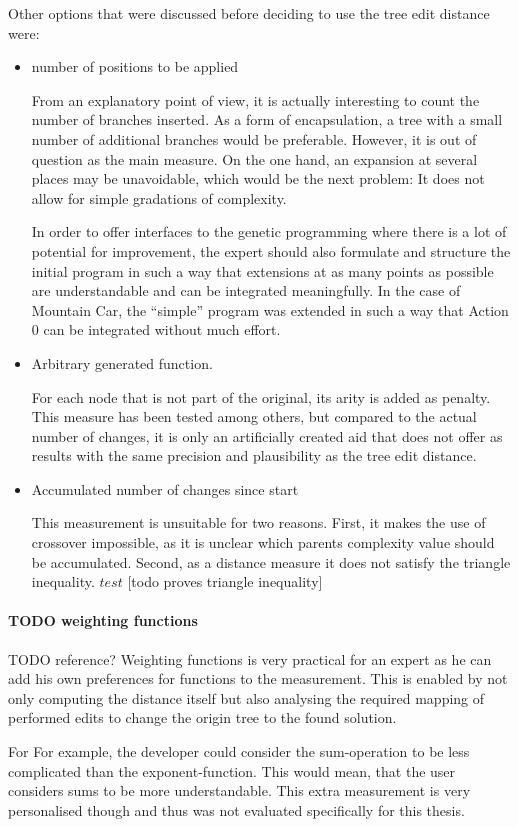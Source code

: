 Other options that were discussed before deciding to use the tree edit distance were:
\begin{itemize}
\item number of positions to be applied

From an explanatory point of view, it is actually interesting to count the number of branches inserted. As a form of encapsulation, a tree with a small number of additional branches would be preferable.
However, it is out of question as the main measure. On the one hand, an expansion at several places may be unavoidable, which would be the next problem: It does not allow for simple gradations of complexity.

In order to offer interfaces to the genetic programming where there is a lot of potential for improvement, the expert should also formulate and structure the initial program in such a way that extensions at as many points as possible are understandable and can be integrated meaningfully. In the case of Mountain Car, the ``simple'' program was extended in such a way that Action 0 can be integrated without much effort.

\item Arbitrary generated function.

For each node that is not part of the original, its arity is added as penalty.
This measure has been tested among others, but compared to the actual number of changes, it is only an artificially created aid that does not offer as results with the same precision and plausibility as the tree edit distance.

\item Accumulated number of changes since start

This measurement is unsuitable for two reasons. First, it makes the use of crossover impossible, as it is unclear which parents complexity value should be accumulated. Second, as a distance measure it does not satisfy the triangle inequality.
$test$ [todo proves triangle inequality]

\end{itemize}

\paragraph{TODO weighting functions}

TODO reference?
Weighting functions is very practical for an expert as he can add his own preferences for functions to the measurement. This is enabled by not only computing the distance itself but also analysing the required mapping of performed edits to change the origin tree to the found solution. 

For For example, the developer could consider the sum-operation to be less complicated than the exponent-function. This would mean, that the user considers sums to be more understandable. This extra measurement is very personalised though and thus was not evaluated specifically for this thesis.

